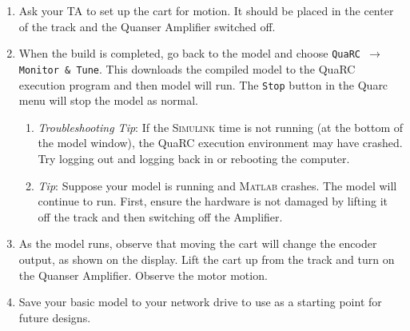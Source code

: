 \documentclass[11pt,letterpaper]{article}
\newcommand{\baro}{\pmb{\rightarrow}}
\begin{document}
\begin{enumerate}
\begin{enumerate}
  \end{enumerate}
  \item Ask your TA to set up the cart for motion. It should be placed in the center of the track and the Quanser Amplifier switched off.
  \item When the build is completed, go back to the model and choose \texttt{QuaRC $\baro$ Monitor \& Tune}. This downloads the compiled model to the QuaRC execution program and then model will run. The \texttt{Stop} button in the Quarc menu will stop the model as normal.
  \begin{enumerate}
    \item \textit{Troubleshooting Tip}: If the \textsc{Simulink} time is not running (at the bottom of the model window), the QuaRC execution environment may have crashed. Try logging out and logging back in or rebooting the computer.
    \item \textit{Tip}: Suppose your model is running and \textsc{Matlab} crashes. The model will continue to run. First, ensure the hardware is not damaged by lifting it off the track and then switching off the Amplifier.
    
  \end{enumerate}
  \item As the model runs, observe that moving the cart will change the encoder output, as shown on the display. Lift the cart up from the track and turn on the Quanser Amplifier. Observe the motor motion.
  \item Save your basic model to your network drive to use as a starting point for future designs.
\end{enumerate}
\end{document}
